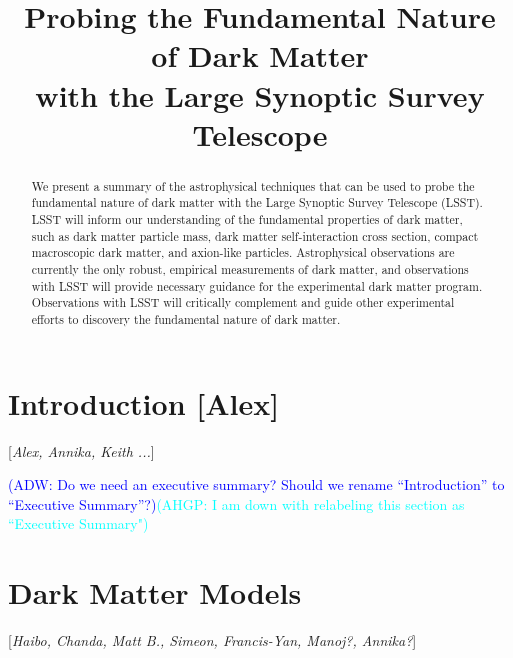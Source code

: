 \documentclass[modern,linenumbers]{aastex62}
\newcommand{\Contributors}[1]{ {\footnotesize [\textit{#1}]}}
\newcommand{\Contact}[1]{ {\footnotesize [\textbf{#1}]}}
\newcommand{\Comment}[3]{\textcolor{#1}{(#2: #3)}}
\newcommand{\ADW}[1]{\Comment{blue}{ADW}{#1}} %
\newcommand{\AHGP}[1]{\Comment{cyan}{AHGP}{#1}} %
\begin{document}
\title{\Large Probing the Fundamental Nature of Dark Matter \\
with the Large Synoptic Survey Telescope}



\begin{abstract}
We present a summary of the astrophysical techniques that can be used to probe the fundamental nature of dark matter with the Large Synoptic Survey Telescope (LSST). 
LSST will inform our understanding of the fundamental properties of dark matter, such as dark matter particle mass, dark matter self-interaction cross section, compact macroscopic dark matter, and axion-like particles.
Astrophysical observations are currently the only robust, empirical measurements of dark matter, and observations with LSST will provide necessary guidance for the experimental dark matter program.
Observations with LSST will critically complement and guide other experimental efforts to discovery the fundamental nature of dark matter.
\end{abstract}

\tableofcontents 


\section{Introduction \Contact{Alex}}
\Contributors{Alex, Annika, Keith ...}
\label{sec:intro}

\ADW{Do we need an executive summary? Should we rename ``Introduction'' to ``Executive Summary''?}\AHGP{I am down with relabeling this section as ``Executive Summary"}




\section{Dark Matter Models}
\Contributors{Haibo, Chanda, Matt B., Simeon, Francis-Yan, Manoj?, Annika?}
\label{sec:theory}

\end{document}
